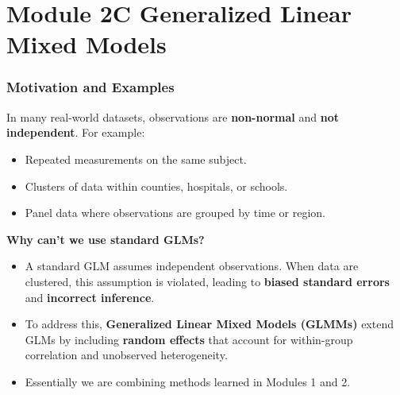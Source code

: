 \documentclass[
  letterpaper,
  DIV=11,
  numbers=noendperiod]{scrreprt}
\providecommand{\tightlist}{%
  \setlength{\itemsep}{0pt}\setlength{\parskip}{0pt}}\usepackage{longtable,booktabs,array}
\begin{document}

\hypertarget{module-2c-generalized-linear-mixed-models}{%
\chapter*{Module 2C Generalized Linear Mixed
Models}\label{module-2c-generalized-linear-mixed-models}}


\hypertarget{motivation-and-examples-3}{%
\subsection*{Motivation and Examples}\label{motivation-and-examples-3}}

\begin{tcolorbox}[enhanced jigsaw, breakable, colbacktitle=quarto-callout-important-color!10!white, left=2mm, colframe=quarto-callout-important-color-frame, opacityback=0, coltitle=black, colback=white, rightrule=.15mm, title=\textcolor{quarto-callout-important-color}{\faExclamation}\hspace{0.5em}{Motivation:}, titlerule=0mm, opacitybacktitle=0.6, leftrule=.75mm, toprule=.15mm, arc=.35mm, bottomtitle=1mm, toptitle=1mm, bottomrule=.15mm]

In many real-world datasets, observations are \textbf{non-normal} and
\textbf{not independent}. For example:

\begin{itemize}
\tightlist
\item
  Repeated measurements on the same subject.
\item
  Clusters of data within counties, hospitals, or schools.
\item
  Panel data where observations are grouped by time or region.
\end{itemize}

\textbf{Why can't we use standard GLMs?}

\begin{itemize}
\item
  A standard GLM assumes independent observations. When data are
  clustered, this assumption is violated, leading to \textbf{biased
  standard errors} and \textbf{incorrect inference}.
\item
  To address this, \textbf{Generalized Linear Mixed Models (GLMMs)}
  extend GLMs by including \textbf{random effects} that account for
  within-group correlation and unobserved heterogeneity.
\item
  Essentially we are combining methods learned in Modules 1 and 2.
\end{itemize}

\end{tcolorbox}
\end{document}
